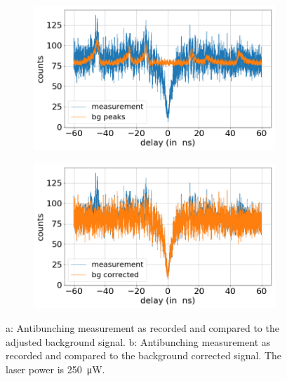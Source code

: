 \begin{figure}[!ht]
    \centering
    \begin{subfigure}{0.47\textwidth}
        \centering
        \includegraphics[width=1.0\textwidth]{img/output_t2/250.0muW_bg_peaks.png}
    \caption{}
    \end{subfigure}
    \begin{subfigure}{0.47\textwidth}
        \centering
        \includegraphics[width=\textwidth]{img/output_t2/250.0muW_bg_vgl.png}
        \caption{}
    \end{subfigure}
    \caption{a: Antibunching measurement as recorded and compared to the adjusted background signal. b: Antibunching measurement as recorded and compared to the background corrected signal. The laser power is \SI{250}{\micro W}.} %
\end{figure}
